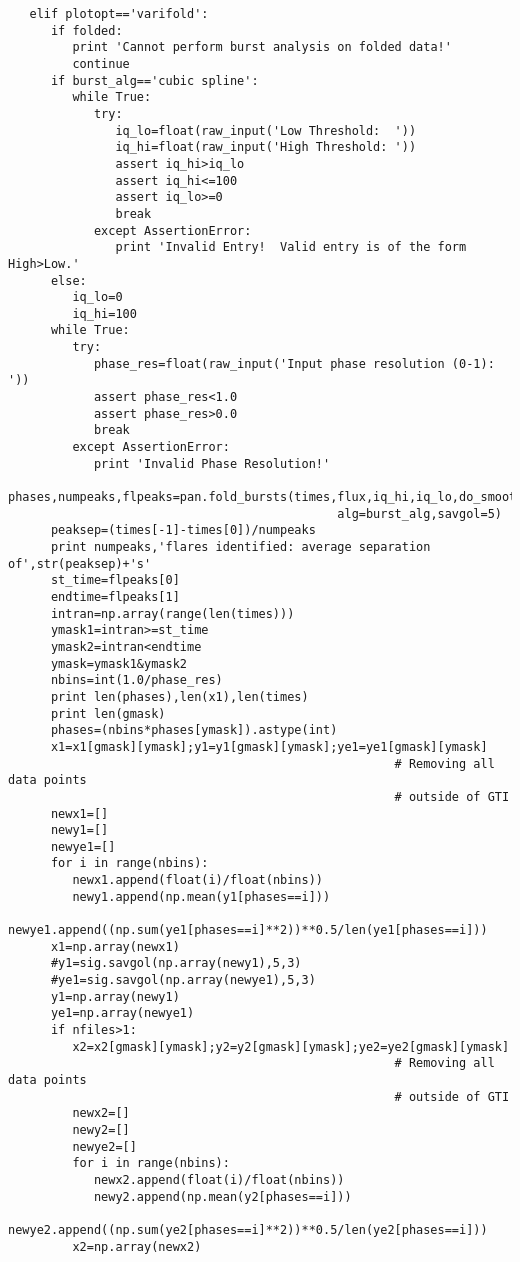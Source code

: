 \begin{verbatim}
   elif plotopt=='varifold':
      if folded:
         print 'Cannot perform burst analysis on folded data!'
         continue
      if burst_alg=='cubic spline':
         while True:
            try:
               iq_lo=float(raw_input('Low Threshold:  '))
               iq_hi=float(raw_input('High Threshold: '))
               assert iq_hi>iq_lo
               assert iq_hi<=100
               assert iq_lo>=0
               break
            except AssertionError:
               print 'Invalid Entry!  Valid entry is of the form High>Low.'
      else:
         iq_lo=0
         iq_hi=100
      while True:
         try:
            phase_res=float(raw_input('Input phase resolution (0-1): '))
            assert phase_res<1.0
            assert phase_res>0.0
            break
         except AssertionError:
            print 'Invalid Phase Resolution!'
      phases,numpeaks,flpeaks=pan.fold_bursts(times,flux,iq_hi,iq_lo,do_smooth=False,
                                              alg=burst_alg,savgol=5)
      peaksep=(times[-1]-times[0])/numpeaks
      print numpeaks,'flares identified: average separation of',str(peaksep)+'s'
      st_time=flpeaks[0]
      endtime=flpeaks[1]
      intran=np.array(range(len(times)))
      ymask1=intran>=st_time
      ymask2=intran<endtime
      ymask=ymask1&ymask2
      nbins=int(1.0/phase_res)
      print len(phases),len(x1),len(times)
      print len(gmask)
      phases=(nbins*phases[ymask]).astype(int)
      x1=x1[gmask][ymask];y1=y1[gmask][ymask];ye1=ye1[gmask][ymask]
                                                      # Removing all data points
                                                      # outside of GTI
      newx1=[]
      newy1=[]
      newye1=[]
      for i in range(nbins):
         newx1.append(float(i)/float(nbins))
         newy1.append(np.mean(y1[phases==i]))
         newye1.append((np.sum(ye1[phases==i]**2))**0.5/len(ye1[phases==i]))
      x1=np.array(newx1)
      #y1=sig.savgol(np.array(newy1),5,3)
      #ye1=sig.savgol(np.array(newye1),5,3)
      y1=np.array(newy1)
      ye1=np.array(newye1)
      if nfiles>1:
         x2=x2[gmask][ymask];y2=y2[gmask][ymask];ye2=ye2[gmask][ymask]
                                                      # Removing all data points
                                                      # outside of GTI
         newx2=[]
         newy2=[]
         newye2=[]
         for i in range(nbins):
            newx2.append(float(i)/float(nbins))
            newy2.append(np.mean(y2[phases==i]))
            newye2.append((np.sum(ye2[phases==i]**2))**0.5/len(ye2[phases==i]))
         x2=np.array(newx2)

\end{verbatim}
